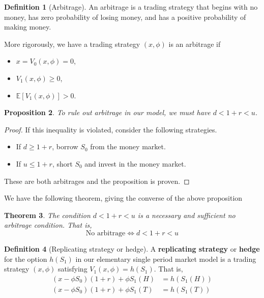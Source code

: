 \documentclass[10pt, oneside, reqno]{amsart}
\theoremstyle{plain}%
\newtheorem{thm}{Theorem}[subsection]
\newtheorem{prop}[thm]{Proposition}
\theoremstyle{definition}
\newtheorem{defn}[thm]{Definition}
\theoremstyle{remark}
\newcommand{\expc}[1]{\mathbb{E}\left[#1\right]}
\begin{document}
\begin{defn}[Arbitrage]
	An arbitrage is a trading strategy that begins with no money, has zero probability of losing money, and has a positive probability of making money.
	
	More rigorously, we have a trading strategy $(x,\phi)$ is an arbitrage if
	\begin{itemize}
		\item $x = V_0(x,\phi) = 0$, 
		\item $V_1(x,\phi) \geq 0$,
		\item $\expc{V_1(x,\phi)} > 0$. 
	\end{itemize}

\end{defn}

\begin{prop}
	To rule out arbitrage in our model, we must have $d < 1+r < u$.  
\end{prop}

\begin{proof}
	If this inequality is violated, consider the following strategies.
	\begin{itemize}
		\item 	If $d \geq 1+r$, borrow $S_0$ from the money market.
		\item If $u \leq 1+r$, short $S_0$ and invest in the money market.
	\end{itemize}
	
	These are both arbitrages and the proposition is proven.
\end{proof}


We have the following theorem, giving the converse of the above proposition
\begin{thm}
	The condition $d < 1+r < u$ is a necessary and sufficient no arbitrage condition.  That is,
	\[
		\text{No arbitrage} \iff d < 1+r < u
	\]
\end{thm}


\begin{defn}[Replicating strategy or hedge]
	A \textbf{replicating strategy} or \textbf{hedge} for the option $h(S_1)$ in our elementary single period market model is a trading strategy $(x,\phi)$ satisfying $V_1(x,\phi) = h(S_1)$.  That is,
	\begin{align*}
		(x-\phi S_0)(1+r) + \phi S_1(H) 	&= h(S_1(H))\\
		(x - \phi S_0)(1+r) + \phi S_1(T) 	&= h(S_1(T))
	\end{align*}
\end{defn}
\end{document}
